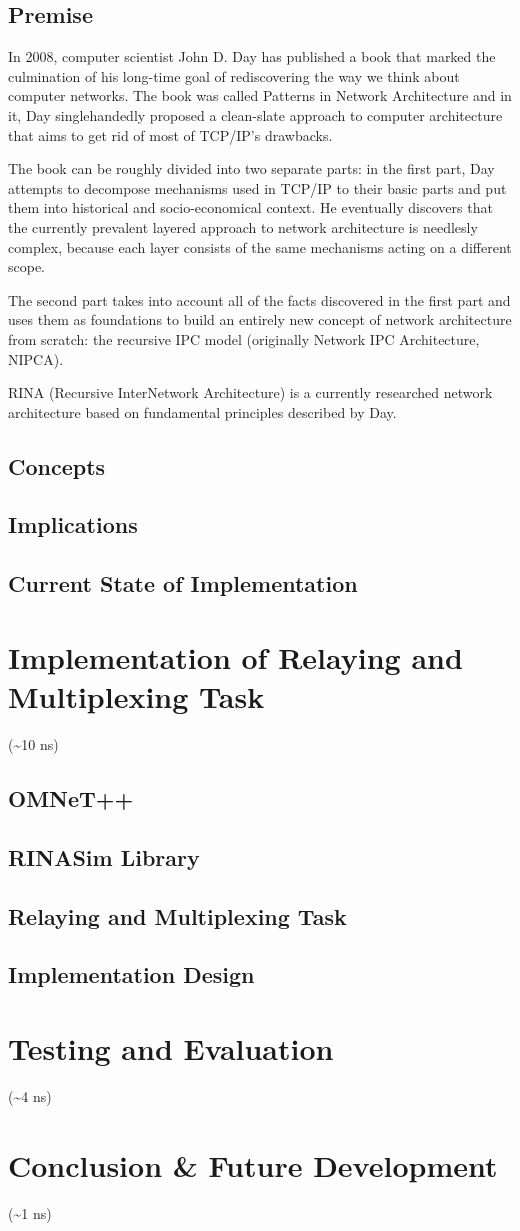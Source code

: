 	\section{Premise}
		In 2008, computer scientist John D. Day has published a book that marked the culmination of his long-time goal of rediscovering the way we think about computer networks. The book was called Patterns in Network Architecture and in it, Day singlehandedly proposed a clean-slate approach to computer architecture that aims to get rid of most of TCP/IP's drawbacks.

		The book can be roughly divided into two separate parts: in the first part, Day attempts to decompose mechanisms used in TCP/IP to their basic parts and put them into historical and socio-economical context. He eventually discovers that the currently prevalent layered approach to network architecture is needlesly complex, because each layer consists of the same mechanisms acting on a different scope.

		The second part takes into account all of the facts discovered in the first part and uses them as foundations to build an entirely new concept of network architecture from scratch: the recursive IPC model (originally Network IPC Architecture, NIPCA).

		RINA (Recursive InterNetwork Architecture) is a currently researched network architecture based on fundamental principles described by Day.


	\section{Concepts}
	\section{Implications}
	\section{Current State of Implementation}

\chapter{Implementation of Relaying and Multiplexing Task}
	(\textasciitilde10 ns)
	\section{OMNeT++}
	\section{RINASim Library}
	\section{Relaying and Multiplexing Task}
	\section{Implementation Design}

\chapter{Testing and Evaluation}
	(\textasciitilde4 ns)

\chapter{Conclusion \& Future Development}
	(\textasciitilde1 ns)
